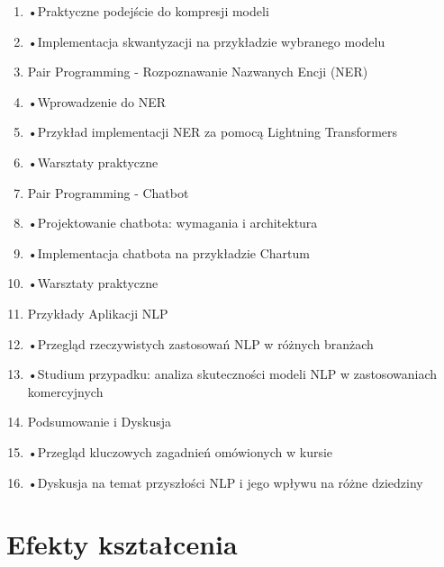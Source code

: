 \documentclass[12pt, a4paper]{article}
\begin{document}
\begin{enumerate}
  \item •Praktyczne podejście do kompresji modeli
  \item •Implementacja skwantyzacji na przykładzie wybranego modelu
  \item Pair Programming - Rozpoznawanie Nazwanych Encji (NER)
  \item •Wprowadzenie do NER
  \item •Przykład implementacji NER za pomocą Lightning Transformers
  \item •Warsztaty praktyczne
  \item Pair Programming - Chatbot
  \item •Projektowanie chatbota: wymagania i architektura
  \item •Implementacja chatbota na przykładzie Chartum
  \item •Warsztaty praktyczne
  \item Przykłady Aplikacji NLP
  \item •Przegląd rzeczywistych zastosowań NLP w różnych branżach
  \item •Studium przypadku: analiza skuteczności modeli NLP w zastosowaniach komercyjnych
  \item Podsumowanie i Dyskusja
  \item •Przegląd kluczowych zagadnień omówionych w kursie
  \item •Dyskusja na temat przyszłości NLP i jego wpływu na różne dziedziny
\end{enumerate}

\section{Efekty kształcenia}
\end{document}
